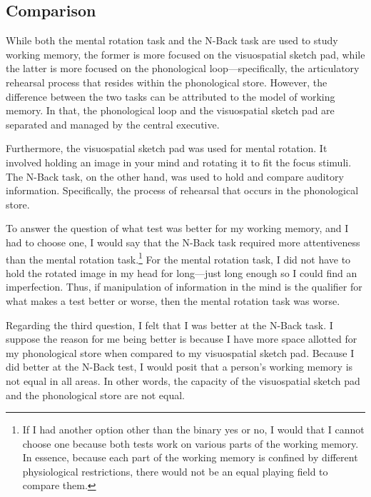 \documentclass[stu,12pt,floatsintext]{apa7}
\begin{document}
\hypertarget{comparison}{\subsection{Comparison}}

    While both the mental rotation task and the N-Back task are used to study working memory, the former is more focused on the visuospatial sketch pad, while the latter is more focused on the phonological loop---specifically, the articulatory rehearsal process that resides within the phonological store. However, the difference between the two tasks can be attributed to the model of working memory. In that, the phonological loop and the visuospatial sketch pad are separated and managed by the central executive.
    
    Furthermore, the visuospatial sketch pad was used for mental rotation. It involved holding an image in your mind and rotating it to fit the focus stimuli. The N-Back task, on the other hand, was used to hold and compare auditory information. Specifically, the process of rehearsal that occurs in the phonological store.

    To answer the question of what test was better for my working memory, and I had to choose one, I would say that the N-Back task required more attentiveness than the mental rotation task.\footnote{If I had another option other than the binary yes or no, I would that I cannot choose one because both tests work on various parts of the working memory. In essence, because each part of the working memory is confined by different physiological restrictions, there would not be an equal playing field to compare them.} For the mental rotation task, I did not have to hold the rotated image in my head for long---just long enough so I could find an imperfection. Thus, if manipulation of information in the mind is the qualifier for what makes a test better or worse, then the mental rotation task was worse.

    Regarding the third question, I felt that I was better at the N-Back task. I suppose the reason for me being better is because I have more space allotted for my phonological store when compared to my visuospatial sketch pad. Because I did better at the N-Back test, I would posit that a person's working memory is not equal in all areas. In other words, the capacity of the visuospatial sketch pad and the phonological store are not equal. 
    
\end{document}
